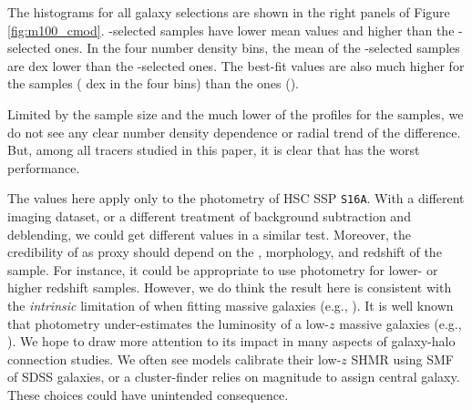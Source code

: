 \documentclass[a4paper,fleqn,usenatbib]{mnras}
\begin{document}
    The \mvir{} histograms for all galaxy selections are shown in the right panels of 
    Figure \ref{fig:m100_cmod}.  
    \mcmodel{}-selected samples have lower mean \mvir{} values and higher \sigmh{}
    than the -selected ones.
    In the four number density bins, the mean \mvir{} of the \mcmodel{}-selected samples are 
    \todo{[XX, XX, XX, XX]} dex lower than the -selected ones.
    The best-fit \sigmh{} values are also much higher for the \mcmodel{} samples 
    (\todo{[0.6, 0.6, 0.6, 0.7]} dex in the four bins) than the  ones 
    (\todo{[0.4, 0.4, 0.4, 0.4]}).

    Limited by the sample size and the much lower \snratio{} of the \dsigma{} profiles
    for the \mcmodel{} samples, we do not see any clear number density dependence or radial
    trend of the difference. 
    But, among all tracers studied in this paper, it is clear that \mcmodel{} has the worst
    performance.
            
    The \sigmh{} values here apply only to the \cmodel{} photometry of HSC SSP \texttt{S16A}.
    With a different imaging dataset, or a different treatment of background subtraction and
    deblending, we could get different \sigmh{} values in a similar test. 
    Moreover, the credibility of \mcmodel{} as \mvir{} proxy should depend on the \mstar{},
    morphology, and redshift of the sample. 
    For instance, it could be appropriate to use \cmodel{} photometry for lower-\mstar{} or
    higher redshift samples. 
    However, we do think the result here is consistent with the \emph{intrinsic} limitation of
    \cmodel{} when fitting massive galaxies (e.g., \addref{}). 
    It is well known that \cmodel{} photometry under-estimates the luminosity of a low-$z$
    massive galaxies (e.g., \addref{}). 
    We hope to draw more attention to its impact in many aspects of galaxy-halo connection
    studies. 
    We often see models calibrate their low-$z$ SHMR using \cmodel{} SMF of SDSS galaxies, or a
    cluster-finder relies on \cmodel{} magnitude to assign central galaxy. These choices could
    have unintended consequence.
\end{document}
